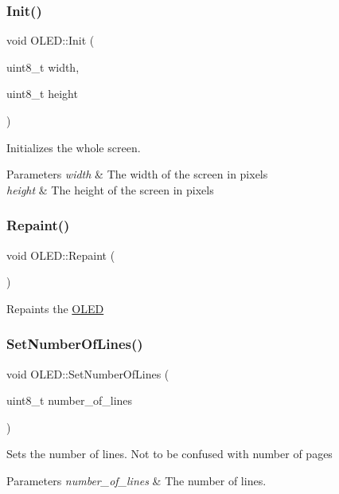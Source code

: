 \subsubsection{\texorpdfstring{Init()}{Init()}}
{\footnotesize\ttfamily void O\+L\+E\+D\+::\+Init (\begin{DoxyParamCaption}\item[{uint8\+\_\+t}]{width,  }\item[{uint8\+\_\+t}]{height }\end{DoxyParamCaption})}

Initializes the whole screen. 
\begin{DoxyParams}{Parameters}
{\em width} & The width of the screen in pixels \\
\hline
{\em height} & The height of the screen in pixels \\
\hline
\end{DoxyParams}
\hypertarget{class_o_l_e_d_a3efa34861b4ae0bc5323f6b7cf1d8a01}{}\label{class_o_l_e_d_a3efa34861b4ae0bc5323f6b7cf1d8a01} 
\subsubsection{\texorpdfstring{Repaint()}{Repaint()}}
{\footnotesize\ttfamily void O\+L\+E\+D\+::\+Repaint (\begin{DoxyParamCaption}{ }\end{DoxyParamCaption})}

Repaints the \hyperlink{class_o_l_e_d}{O\+L\+ED} \hypertarget{class_o_l_e_d_aa3c88e19f05340036ea5ac9e2d1ea5dc}{}\label{class_o_l_e_d_aa3c88e19f05340036ea5ac9e2d1ea5dc} 
\subsubsection{\texorpdfstring{Set\+Number\+Of\+Lines()}{SetNumberOfLines()}}
{\footnotesize\ttfamily void O\+L\+E\+D\+::\+Set\+Number\+Of\+Lines (\begin{DoxyParamCaption}\item[{uint8\+\_\+t}]{number\+\_\+of\+\_\+lines }\end{DoxyParamCaption})}

Sets the number of lines. Not to be confused with number of pages 
\begin{DoxyParams}{Parameters}
{\em number\+\_\+of\+\_\+lines} & The number of lines. \\
\hline
\end{DoxyParams}
\hypertarget{class_o_l_e_d_a7fa307269dbd2e80a6e48a1442df83d2}{}\label{class_o_l_e_d_a7fa307269dbd2e80a6e48a1442df83d2} 
